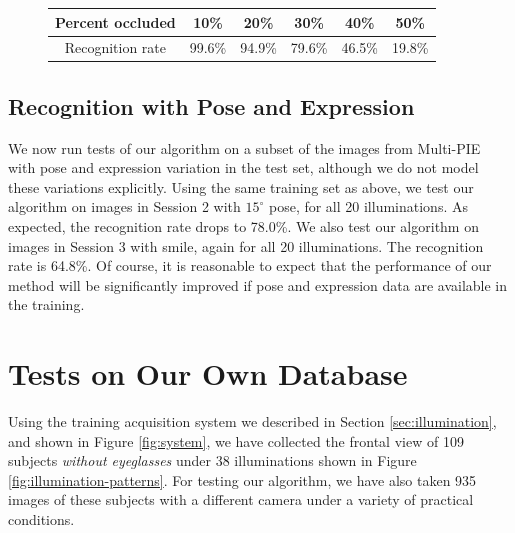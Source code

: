 \documentclass[12pt,journal,draftcls,letterpaper,onecolumn]{IEEEtran}
\providecommand{\DIFaddbeginFL}{} %
\providecommand{\DIFaddendFL}{} %
\providecommand{\DIFdelbeginFL}{} %
\providecommand{\DIFdelendFL}{} %
\begin{document}
\begin{figure}[t]
\DIFaddbeginFL \vspace{3mm}
{\small
\DIFaddendFL \begin{tabular}{|c|c|c|c|c|c| }
\hline
Percent occluded & 10\% & 20\% & 30\% & 40\% & 50\%  \\
\hline
\hline
Recognition rate & 99.6\% & 94.9\% & 79.6\% & 46.5\% & 19.8\% \\
\hline
\end{tabular}
\DIFaddbeginFL }
\DIFaddendFL \label{fig:multipie-occ-rec}
\DIFdelbeginFL %
\DIFdelendFL \DIFaddbeginFL \vspace{-.25in}
\DIFaddendFL \end{figure}

\subsection{Recognition with Pose and Expression} We now run tests of
our algorithm on a subset of the images from Multi-PIE with pose and expression variation in the test set, although we do not model these variations explicitly.
Using the same training set as above, we test our algorithm on
images in Session 2 with $15^\circ$ pose, for all 20
illuminations. As expected, the recognition rate drops to 78.0\%. We also test our
algorithm on images in Session 3 with smile, again for all 20
illuminations. The recognition rate is 64.8\%. Of course, it is reasonable to expect that
the performance of our method will be significantly improved if pose and expression data
are available in the training.


\section{Tests on Our Own Database}\label{sec:own-data} Using the training acquisition
system we described in Section \ref{sec:illumination}, and shown in Figure
\ref{fig:system}, we have collected the frontal view of 109
subjects {\em without eyeglasses} under 38 illuminations shown
in Figure \ref{fig:illumination-patterns}. For testing our
algorithm, we have also taken 935 images of these subjects with
a different camera under a variety of practical conditions.
\end{document}
